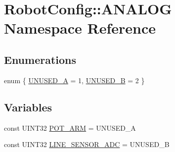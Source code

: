 \hypertarget{namespace_robot_config_1_1_a_n_a_l_o_g}{
\section{\-Robot\-Config\-:\-:\-A\-N\-A\-L\-O\-G \-Namespace \-Reference}
\label{namespace_robot_config_1_1_a_n_a_l_o_g}
}
\subsection*{\-Enumerations}
\begin{DoxyCompactItemize}
\item 
enum \{ \hyperlink{namespace_robot_config_1_1_a_n_a_l_o_g_a5eb3a206f2212a2968653d1f313f93c3afaa24c07a95efd7ec0c58362808fe3d3}{\-U\-N\-U\-S\-E\-D\-\_\-\-A} =  1, 
\hyperlink{namespace_robot_config_1_1_a_n_a_l_o_g_a5eb3a206f2212a2968653d1f313f93c3a860daba4f6652187596feee56a0045db}{\-U\-N\-U\-S\-E\-D\-\_\-\-B} =  2
 \}
\end{DoxyCompactItemize}
\subsection*{\-Variables}
\begin{DoxyCompactItemize}
\item 
const \-U\-I\-N\-T32 \hyperlink{namespace_robot_config_1_1_a_n_a_l_o_g_ae263e4ec55968ecbd434564aef75c25e}{\-P\-O\-T\-\_\-\-A\-R\-M} = \-U\-N\-U\-S\-E\-D\-\_\-\-A
\item 
const \-U\-I\-N\-T32 \hyperlink{namespace_robot_config_1_1_a_n_a_l_o_g_ab63e9ddbc000430dc4252c6aa2045b29}{\-L\-I\-N\-E\-\_\-\-S\-E\-N\-S\-O\-R\-\_\-\-A\-D\-C} = \-U\-N\-U\-S\-E\-D\-\_\-\-B
\end{DoxyCompactItemize}


